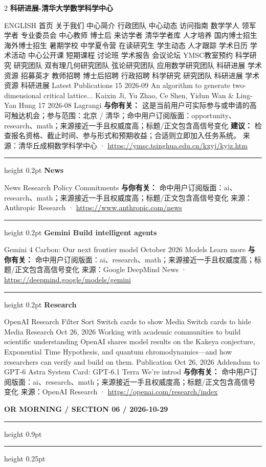 \documentclass[10.5pt]{ctexart}
\begin{document}
\begin{multicols}{2}
{\large\bfseries 科研进展-清华大学数学科学中心}\par
ENGLISH 首页 关于我们 中心简介 行政团队 中心动态 访问指南 数学学人 领军学者 专业委员会 中心教师 博士后 来访学者 清华学者库 人才培养 国内博士招生 海外博士招生 暑期学校 中学夏令营 在读研究生 学生动态 人才跟踪 学术日历 学术活动 中心公开课 短期课程 讨论班 学术报告 会议论坛 YMSC教室预约 科学研究 研究团队 双有理几何研究团队 弦论研究团队 应用数学研究团队 科研进展 学术资源 招募英才 教师招聘 博士后招聘 行政招聘 科学研究 研究团队 科研进展 学术资源 科研进展 Latest Publications 15 2026-09 An algorithm to generate two-dimensional critical lattice... Kaixin Ji, Yu Zhao, Ce Shen, Yidun Wan \& Ling-Yan Hung 17 2026-08 Lagrangi
\textbf{与你有关：} 这是当前用户可实际参与或申请的高可触达机会；参与范围：北京 / 清华；命中用户订阅版面：opportunity、research、math；来源接近一手且权威度高；标题/正文包含高信号变化
\textbf{建议：} 检查报名资格、截止时间、参与形式和预期收益；合适则立即加入任务系统。
{\footnotesize\color{ormuted} 来源：清华丘成桐数学科学中心 · \url{https://ymsc.tsinghua.edu.cn/kxyj/kyjz.htm}}
\vspace{2mm}
\hrule height 0.2pt
\vspace{2mm}
{\large\bfseries News}\par
News Research Policy Commitments
\textbf{与你有关：} 命中用户订阅版面：ai、research、math；来源接近一手且权威度高；标题/正文包含高信号变化
{\footnotesize\color{ormuted} 来源：Anthropic Research · \url{https://www.anthropic.com/news}}
\vspace{2mm}
\hrule height 0.2pt
\vspace{2mm}
{\large\bfseries Gemini Build intelligent agents}\par
Gemini 4 Carbon: Our next frontier model October 2026 Models Learn more
\textbf{与你有关：} 命中用户订阅版面：ai、research、math；来源接近一手且权威度高；标题/正文包含高信号变化
{\footnotesize\color{ormuted} 来源：Google DeepMind News · \url{https://deepmind.google/models/gemini}}
\vspace{2mm}
\hrule height 0.2pt
\vspace{2mm}
{\large\bfseries Research}\par
OpenAI Research Filter Sort Switch cards to show Media Switch cards to hide Media Research Oct 26, 2026 Working with academic communities to build scientific understanding OpenAI shares model results on the Kakeya conjecture, Exponential Time Hypothesis, and quantum chromodynamics—and how researchers can verify and build on them. Publication Oct 26, 2026 Addendum to GPT‑6 Astra System Card: GPT‑6.1 Terra We’re introd
\textbf{与你有关：} 命中用户订阅版面：ai、research、math；来源接近一手且权威度高；标题/正文包含高信号变化
{\footnotesize\color{ormuted} 来源：OpenAI Research · \url{https://openai.com/research/index}}
\end{multicols}
\newpage
{\small\bfseries OR MORNING / SECTION 06 / 2026-10-29}
\vspace{2mm}
\hrule height 0.9pt
\vspace{1.5mm}
\hrule height 0.25pt
\vspace{4mm}
\end{document}
